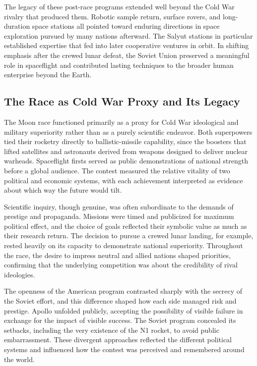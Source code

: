 The legacy of these post-race programs extended well beyond the Cold War rivalry that produced them. Robotic sample return, surface rovers, and long-duration space stations all pointed toward enduring directions in space exploration pursued by many nations afterward. The Salyut stations in particular established expertise that fed into later cooperative ventures in orbit. In shifting emphasis after the crewed lunar defeat, the Soviet Union preserved a meaningful role in spaceflight and contributed lasting techniques to the broader human enterprise beyond the Earth. \cite{siddiqi2010} \cite{nasa2019}

\subsection{The Race as Cold War Proxy and Its Legacy}
The Moon race functioned primarily as a proxy for Cold War ideological and military superiority rather than as a purely scientific endeavor. Both superpowers tied their rocketry directly to ballistic-missile capability, since the boosters that lifted satellites and astronauts derived from weapons designed to deliver nuclear warheads. Spaceflight firsts served as public demonstrations of national strength before a global audience. The contest measured the relative vitality of two political and economic systems, with each achievement interpreted as evidence about which way the future would tilt.

Scientific inquiry, though genuine, was often subordinate to the demands of prestige and propaganda. Missions were timed and publicized for maximum political effect, and the choice of goals reflected their symbolic value as much as their research return. The decision to pursue a crewed lunar landing, for example, rested heavily on its capacity to demonstrate national superiority. Throughout the race, the desire to impress neutral and allied nations shaped priorities, confirming that the underlying competition was about the credibility of rival ideologies.

The openness of the American program contrasted sharply with the secrecy of the Soviet effort, and this difference shaped how each side managed risk and prestige. Apollo unfolded publicly, accepting the possibility of visible failure in exchange for the impact of visible success. The Soviet program concealed its setbacks, including the very existence of the N1 rocket, to avoid public embarrassment. These divergent approaches reflected the different political systems and influenced how the contest was perceived and remembered around the world.

